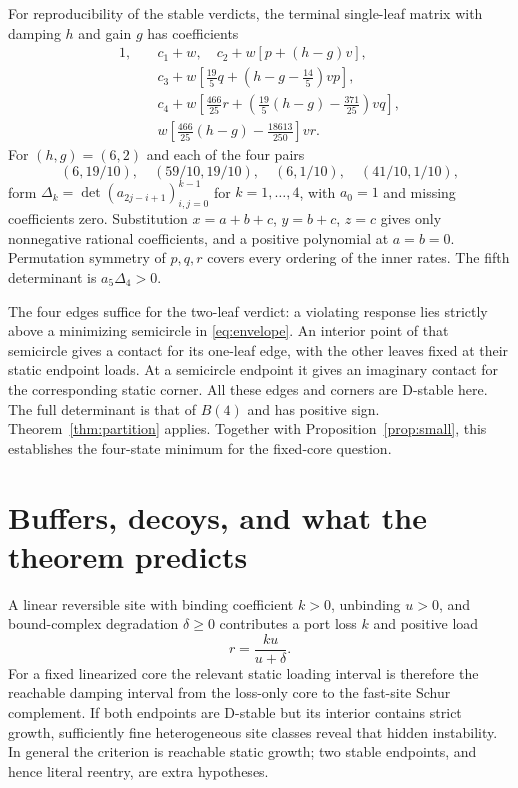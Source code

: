 \documentclass[11pt]{article}
\theoremstyle{remark}\newtheorem{remark}[theorem]{Remark}
\begin{document}
For reproducibility of the stable verdicts, the terminal single-leaf
matrix with damping $h$ and gain $g$ has coefficients
\begin{align*}
 1,\quad&c_1+w,\quad c_2+w[p+(h-g)v],\\
 &c_3+w[\tfrac{19}{5}q+(h-g-\tfrac{14}{5})vp],\\
 &c_4+w[\tfrac{466}{25}r+(\tfrac{19}{5}(h-g)-\tfrac{371}{25})vq],\\
 &w[\tfrac{466}{25}(h-g)-\tfrac{18613}{250}]vr.
\end{align*}
For $(h,g)=(6,2)$ and each of the four pairs
\[
 (6,19/10),\quad(59/10,19/10),\quad(6,1/10),\quad(41/10,1/10),
\]
form
$\Delta_k=\det(a_{2j-i+1})_{i,j=0}^{k-1}$ for $k=1,\ldots,4$, with
$a_0=1$ and missing coefficients zero. Substitution
$x=a+b+c$, $y=b+c$, $z=c$ gives only nonnegative rational coefficients,
and a positive polynomial at $a=b=0$. Permutation symmetry of $p,q,r$
covers every ordering of the inner rates. The fifth determinant is
$a_5\Delta_4>0$.

The four edges suffice for the two-leaf verdict: a violating response lies
strictly above a minimizing semicircle in \eqref{eq:envelope}. An interior
point of that semicircle gives a contact for its one-leaf edge, with the
other leaves fixed at their static endpoint loads. At a semicircle endpoint
it gives an imaginary contact for the corresponding static corner.
All these edges and corners are D-stable here. The full determinant is
that of $B(4)$ and has positive sign. Theorem~\ref{thm:partition} applies.
Together with Proposition~\ref{prop:small}, this establishes the four-state
minimum for the fixed-core question.

\section{Buffers, decoys, and what the theorem predicts}
A linear reversible site with binding coefficient $k>0$, unbinding $u>0$,
and bound-complex degradation $\delta\ge0$ contributes a port loss $k$
and positive load
\[
 r=\frac{ku}{u+\delta}.
\]
For a fixed linearized core the relevant static loading interval is therefore
the reachable damping interval from the loss-only core to the fast-site
Schur complement. If both endpoints are D-stable but its interior contains
strict growth, sufficiently fine heterogeneous site classes reveal that
hidden instability. In general the criterion is reachable static growth;
two stable endpoints, and hence literal reentry, are extra hypotheses.
\end{document}
